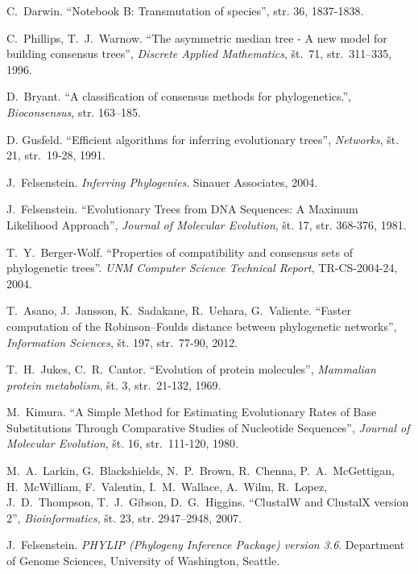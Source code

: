\documentclass[a4paper, 12pt]{book}
\begin{document}
\begin{thebibliography}{99}

C.\ Darwin. ``Notebook B: Transmutation of species'', str. 36, 1837-1838.

C.\ Phillips, T.\ J.\ Warnow. 
``The asymmetric median tree - A new model for building consensus trees'', 
{\it Discrete Applied Mathematics}, št.\ 71, str.\ 311–335, 1996.

D.\ Bryant. ``A classification of consensus methods for phylogenetics.'', 
{\it Bioconsensus}, str. 163–185.

D. Gusfeld. ``Efficient algorithms for inferring evolutionary trees'', 
{\it Networks}, št. 21, str.\ 19-28, 1991.

J.\ Felsenstein. \textit{Inferring Phylogenies}. Sinauer Associates, 2004.

J.\ Felsenstein. ``Evolutionary Trees from DNA Sequences: A Maximum Likelihood Approach'', 
{\it Journal of Molecular Evolution}, št. 17, str. 368-376, 1981.

T.\ Y.\ Berger-Wolf. 
``Properties of compatibility and consensus sets of phylogenetic trees''. 
{\it UNM Computer Science Technical Report}, TR-CS-2004-24, 2004.

T.\ Asano, J.\ Jansson, K.\ Sadakane, R.\ Uehara, G.\ Valiente. 
``Faster computation of the Robinson–Foulds distance between phylogenetic networks'', 
{\it Information Sciences}, št. 197, str.\ 77-90, 2012.

T.\ H.\ Jukes, C.\ R.\ Cantor. ``Evolution of protein molecules'', 
{\it Mammalian protein metabolism}, št. 3, str.\ 21-132, 1969.

M.\ Kimura. 
``A Simple Method for Estimating Evolutionary Rates of Base Substitutions 
Through Comparative Studies of Nucleotide Sequences'', 
{\it Journal of Molecular Evolution}, št. 16, str.\ 111-120, 1980.

M.\ A.\ Larkin, G.\ Blackshields, N.\ P.\ Brown, R.\ Chenna, 
P.\ A.\ McGettigan, H.\ McWilliam, F.\ Valentin, I.\ M.\ Wallace, 
A.\ Wilm, R.\ Lopez, J.\ D.\ Thompson,
T.\ J.\ Gibson, D.\ G.\ Higgins. 
``ClustalW and ClustalX version 2'', 
{\it Bioinformatics}, št. 23, str. 2947–2948, 2007.

J.\ Felsenstein. {\it PHYLIP (Phylogeny Inference Package) version 3.6}. 
Department of Genome Sciences, University of Washington, Seattle.


\end{thebibliography}
\end{document}
